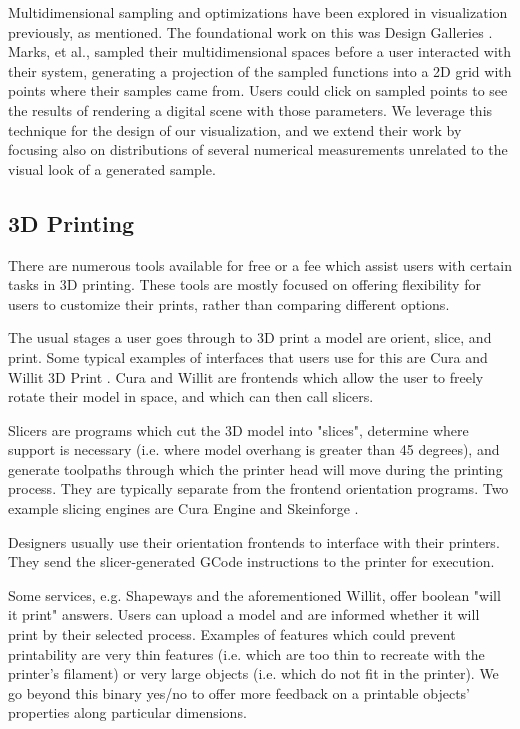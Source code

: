 \documentclass{sigchi}
\begin{document}
Multidimensional sampling and optimizations have been explored in visualization previously, as mentioned.  The foundational work on this was Design Galleries \cite{design-galleries}.  Marks, et al., sampled their multidimensional spaces before a user interacted with their system, generating a projection of the sampled functions into a 2D grid with points where their samples came from.  Users could click on sampled points to see the results of rendering a digital scene with those parameters.  We leverage this technique for the design of our visualization, and we extend their work by focusing also on distributions of several numerical measurements unrelated to the visual look of a generated sample.

\subsection{3D Printing}
There are numerous tools available for free or a fee which assist users with certain tasks in 3D printing.  These tools are mostly focused on offering flexibility for users to customize their prints, rather than comparing different options.

The usual stages a user goes through to 3D print a model are orient, slice, and print.  Some typical examples of interfaces that users use for this are Cura \cite{cura} and Willit 3D Print \cite{willit}.  Cura and Willit are frontends which allow the user to freely rotate their model in space, and which can then call slicers.

Slicers are programs which cut the 3D model into "slices", determine where support is necessary (i.e. where model overhang is greater than 45 degrees), and generate toolpaths through which the printer head will move during the printing process.  They are typically separate from the frontend orientation programs.  Two example slicing engines are Cura Engine \cite{cura-engine} and Skeinforge \cite{skeinforge}.

Designers usually use their orientation frontends to interface with their printers.  They send the slicer-generated GCode instructions to the printer for execution.

Some services, e.g. Shapeways \cite{shapeways} and the aforementioned Willit, offer boolean "will it print" answers.  Users can upload a model and are informed whether it will print by their selected process.  Examples of features which could prevent printability are very thin features (i.e. which are too thin to recreate with the printer's filament) or very large objects (i.e. which do not fit in the printer).  We go beyond this binary yes/no to offer more feedback on a printable objects' properties along particular dimensions.
\end{document}
